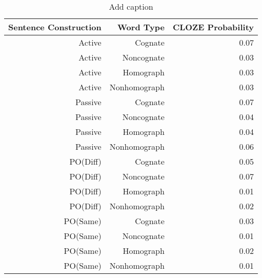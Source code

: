 \begin{table}[htbp]
  \centering
  \caption{Add caption}
    \begin{tabular}{rrr}
    \toprule
    Sentence Construction & Word Type & CLOZE Probability \\
    \midrule
    Active & Cognate & 0.07 \\
    Active & Noncognate & 0.03 \\
    Active & Homograph & 0.03 \\
    Active & Nonhomograph & 0.03 \\
    Passive & Cognate & 0.07 \\
    Passive & Noncognate & 0.04 \\
    Passive & Homograph & 0.04 \\
    Passive & Nonhomograph & 0.06 \\
    PO(Diff) & Cognate & 0.05 \\
    PO(Diff) & Noncognate & 0.07 \\
    PO(Diff) & Homograph & 0.01 \\
    PO(Diff) & Nonhomograph & 0.02 \\
    PO(Same) & Cognate & 0.03 \\
    PO(Same) & Noncognate & 0.01 \\
    PO(Same) & Homograph & 0.02 \\
    PO(Same) & Nonhomograph & 0.01 \\
    \bottomrule
    \end{tabular}%
  \label{tab:addlabel}%
\end{table}%
